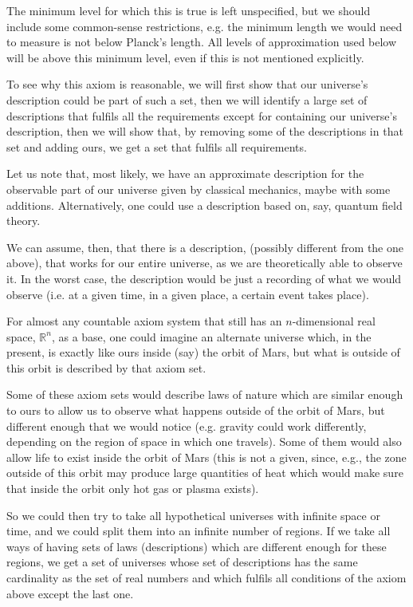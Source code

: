 \documentclass[a4paper
,draft
]{article}
\def\reale{\mathbb{R}}
\begin{document}
The minimum level for which this is true is left unspecified, but we should
include some common-sense restrictions, e.g. the minimum length we would
need to measure is not below Planck's length.
All levels of approximation used below will be above this
minimum level, even if this is not mentioned explicitly.

To see why this axiom is reasonable, we will first show that our universe's
description could be part of such a set, then we will identify a large set
of descriptions that fulfils all the requirements except for containing
our universe's description, then we will show that, by removing some of the
descriptions in that set and adding ours, we get a set that fulfils all
requirements.

Let us note that,
most likely, we have an approximate description for the observable part
of our universe
given by classical mechanics, maybe with some additions.
Alternatively, one could use a description based on, say, quantum field theory.

We can assume, then, that there is a description,
(possibly different from the one above), that works for our entire universe,
as we are theoretically able to observe it. In the worst case, the description
would be just a recording of what we would observe (i.e. at a given time, in
a given place, a certain event takes place).

For almost any countable axiom system that still
has an $n$-dimensional real space, $\reale^n$, as a base,
one could imagine an alternate universe
which, in the present, is exactly like ours inside (say) the orbit of Mars,
but what is outside of this orbit is described by that axiom set.

Some of these axiom sets would describe laws of nature which are similar enough
to ours to allow us to observe what happens outside of the orbit of Mars,
but different enough that
we would notice (e.g. gravity could work differently, depending on the region
of space in which one travels). Some of them would also allow life
to exist inside the orbit of Mars (this is not a given, since, e.g., the zone
outside of this orbit may produce large quantities of heat which
would make sure that inside the orbit only hot gas or plasma exists).

So we could then try to take all hypothetical universes with infinite space
or time, and we could split them into an infinite number of regions. If we take
all ways of having sets of laws (descriptions) which are different enough
for these regions,
we get a set of universes whose set of descriptions has the same cardinality
as the set of real numbers and which fulfils all conditions of the axiom
above except the last one.
\end{document}

